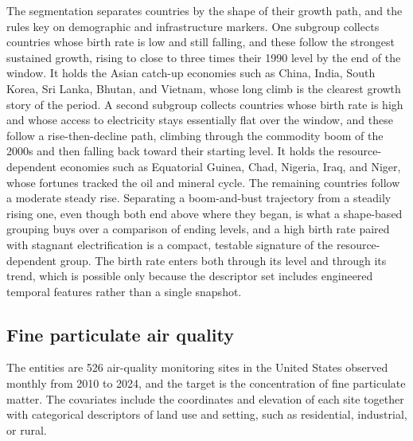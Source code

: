 The segmentation separates countries by the shape of their growth path, and the rules key on demographic and infrastructure markers. One subgroup collects countries whose birth rate is low and still falling, and these follow the strongest sustained growth, rising to close to three times their 1990 level by the end of the window. It holds the Asian catch-up economies such as China, India, South Korea, Sri Lanka, Bhutan, and Vietnam, whose long climb is the clearest growth story of the period. A second subgroup collects countries whose birth rate is high and whose access to electricity stays essentially flat over the window, and these follow a rise-then-decline path, climbing through the commodity boom of the 2000s and then falling back toward their starting level. It holds the resource-dependent economies such as Equatorial Guinea, Chad, Nigeria, Iraq, and Niger, whose fortunes tracked the oil and mineral cycle. The remaining countries follow a moderate steady rise. Separating a boom-and-bust trajectory from a steadily rising one, even though both end above where they began, is what a shape-based grouping buys over a comparison of ending levels, and a high birth rate paired with stagnant electrification is a compact, testable signature of the resource-dependent group. The birth rate enters both through its level and through its trend, which is possible only because the descriptor set includes engineered temporal features rather than a single snapshot.

\subsection{Fine particulate air quality}
\label{sec:epa}

The entities are 526 air-quality monitoring sites in the United States observed monthly from 2010 to 2024, and the target is the concentration of fine particulate matter. The covariates include the coordinates and elevation of each site together with categorical descriptors of land use and setting, such as residential, industrial, or rural.

